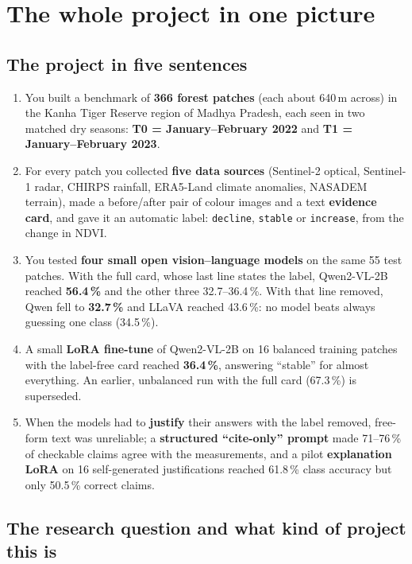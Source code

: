 \chapter{The whole project in one picture}
\label{ch:bigpicture}

\section{The project in five sentences}

\begin{enumerate}
  \item You built a benchmark of \textbf{366 forest patches} (each about 640\,m across) in the Kanha Tiger Reserve region of Madhya Pradesh, each seen in two matched dry seasons: \textbf{T0 = January--February 2022} and \textbf{T1 = January--February 2023}.
  \item For every patch you collected \textbf{five data sources} (Sentinel-2 optical, Sentinel-1 radar, CHIRPS rainfall, ERA5-Land climate anomalies, NASADEM terrain), made a before/after pair of colour images and a text \textbf{evidence card}, and gave it an automatic label: \texttt{decline}, \texttt{stable} or \texttt{increase}, from the change in NDVI.
  \item You tested \textbf{four small open vision--language models} on the same 55 test patches. With the full card, whose last line states the label, Qwen2-VL-2B reached \textbf{56.4\,\%} and the other three 32.7--36.4\,\%. With that line removed, Qwen fell to \textbf{32.7\,\%} and LLaVA reached 43.6\,\%: no model beats always guessing one class (34.5\,\%).
  \item A small \textbf{LoRA fine-tune} of Qwen2-VL-2B on 16 balanced training patches with the label-free card reached \textbf{36.4\,\%}, answering ``stable'' for almost everything. An earlier, unbalanced run with the full card (67.3\,\%) is superseded.
  \item When the models had to \textbf{justify} their answers with the label removed, free-form text was unreliable; a \textbf{structured ``cite-only'' prompt} made 71--76\,\% of checkable claims agree with the measurements, and a pilot \textbf{explanation LoRA} on 16 self-generated justifications reached 61.8\,\% class accuracy but only 50.5\,\% correct claims.
\end{enumerate}

\section{The research question and what kind of project this is}

